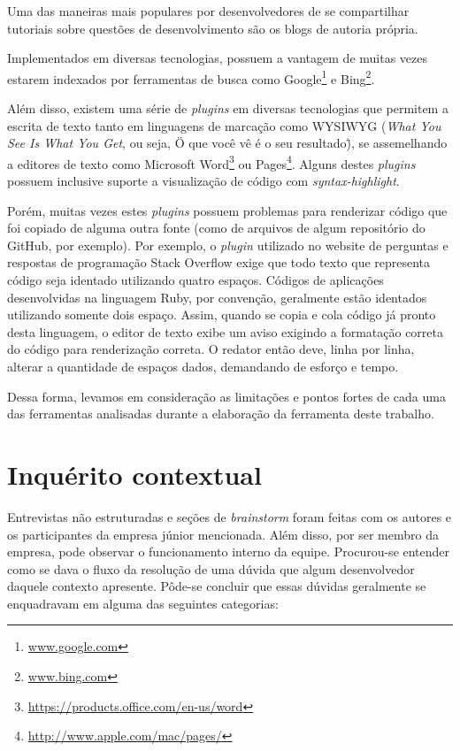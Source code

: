 Uma das maneiras mais populares por desenvolvedores de se compartilhar tutoriais sobre questões de desenvolvimento são os blogs de autoria própria.

Implementados em diversas tecnologias, possuem a vantagem de muitas vezes estarem indexados por ferramentas de busca como Google\footnote{\url{www.google.com}} e Bing\footnote{\url{www.bing.com}}.

Além disso, existem uma série de \textit{plugins} em diversas tecnologias que permitem a escrita de texto tanto em linguagens de marcação como WYSIWYG (\textit{What You See Is What You Get}, ou seja, \"O que você vê é o seu resultado\"), se assemelhando a editores de texto como Microsoft Word\footnote{\url{https://products.office.com/en-us/word}} ou Pages\footnote{\url{http://www.apple.com/mac/pages/}}. Alguns destes \textit{plugins} possuem inclusive suporte a visualização de código com \textit{syntax-highlight}.

Porém, muitas vezes estes \textit{plugins} possuem problemas para renderizar código que foi copiado de alguma outra fonte (como de arquivos de algum repositório do GitHub, por exemplo). Por exemplo, o \textit{plugin} utilizado no website de perguntas e respostas de programação Stack Overflow exige que todo texto que representa código seja identado utilizando quatro espaços. Códigos de aplicações desenvolvidas na linguagem Ruby, por convenção, geralmente estão identados utilizando somente dois espaço. Assim, quando se copia e cola código já pronto desta linguagem, o editor de texto exibe um aviso exigindo a formatação correta do código para renderização correta. O redator então deve, linha por linha, alterar a quantidade de espaços dados, demandando de esforço e tempo.


Dessa forma, levamos em consideração as limitações e pontos fortes de cada uma das ferramentas analisadas durante a elaboração da ferramenta deste trabalho.

\section{Inquérito contextual}


Entrevistas não estruturadas e seções de \textit{brainstorm} foram feitas com os autores e os participantes da empresa júnior mencionada. Além disso, por ser membro da empresa, pode observar o funcionamento interno da equipe. Procurou-se entender como se dava o fluxo da resolução de uma dúvida que algum desenvolvedor daquele contexto apresente. Pôde-se concluir que essas dúvidas geralmente se enquadravam em alguma das seguintes categorias:

